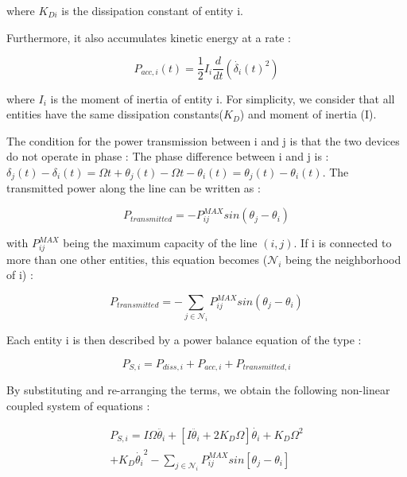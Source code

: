\documentclass[conference]{IEEEtran}
\begin{document}
where $ K_{Di} $ is the dissipation constant of entity i.

Furthermore, it also accumulates kinetic energy at a rate : 

\begin{equation} 
P_{acc,i}(t) = \frac{1}{2}I_i\frac{d}{dt} \left( \dot{ \delta_i }(t)^2 \right)
\end{equation} 

where $ I_{i}$ is the moment of inertia of entity i. For simplicity, we consider that all entities have the same dissipation constants($K_D$) and moment of inertia (I).

The condition for the power transmission between i and j is that the two devices do not operate in phase : The phase difference between i and j is : $ \delta_j(t) - \delta_i(t) = \Omega t + \theta_j(t) - \Omega t - \theta_i(t) = \theta_j(t) - \theta_i(t) $. The transmitted power along the line can be written as : 

\begin{equation}
 P_{transmitted} = - P_{ij}^{MAX} sin( \theta_j - \theta_i )
\end{equation}
  
with $ P_{ij}^{MAX} $ being the maximum capacity of the line $(i,j)$. If i is connected to more than one other entities, this equation becomes ($\mathcal{N}_i$ being the neighborhood of  i) : 

\begin{equation}
  P_{transmitted} = - \sum_{j \in \mathcal{N}_i} P_{ij}^{MAX} sin( \theta_j - \theta_i ) 
\end{equation}


Each entity i is then described by a power balance equation of the type :

\begin{equation}
 P_{S,i}  =  P_{diss,i} + P_{acc,i} + P_{transmitted,i} 
\end{equation}

By substituting and re-arranging the terms, we obtain the following non-linear coupled system of equations :

\begin{equation}
\label{eq:without_simplification}
\begin{array}{lll}
P_{S, i}  =  I \Omega \ddot{ \theta_i }  + \left[ I \ddot{ \theta_i } + 2 K_D \Omega \right] \dot{ \theta_i } + K_D \Omega^2 \\+ K_D \dot{ \theta_i }^2 - \sum_{j \in \mathcal{N}_i} P_{ij}^{MAX} sin \left[ \theta_j - \theta_i \right] \end{array}
\end{equation}
\end{document}
